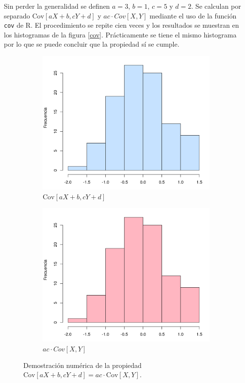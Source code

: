 \documentclass[12pt]{article}
\begin{document}
	Sin perder la generalidad se definen $a=3$, $b=1$, $c=5$ y $d=2$. Se calculan por separado $\text{Cov}[aX+b, cY+d]$ y $ac \cdot Cov[X,Y]$ mediante el uso de la función \texttt{cov} de \textsc{R}. El procedimiento se repite cien veces y los resultados se muestran en los histogramas de la figura \ref{cov}. Prácticamente se tiene el mismo histograma por lo que se puede concluir que la propiedad sí se cumple.
	
	\begin{figure}
		\begin{subfigure}{0.5\textwidth}
			\centering
			\includegraphics[scale=0.5]{cov_abcd.png}
			\caption{$\text{Cov}[aX+b, cY+d]$}
		\end{subfigure}
		\begin{subfigure}{0.5\textwidth}
			\centering
			\includegraphics[scale=0.5]{cov_ac.png}
			\caption{$ac \cdot Cov[X,Y]$}
		\end{subfigure}
		\caption{Demostración numérica de la propiedad  $\text{Cov}[aX+b, cY+d] = ac \cdot \text{Cov}[X,Y]$.}
		\label{var}
	\end{figure}
\end{document}
